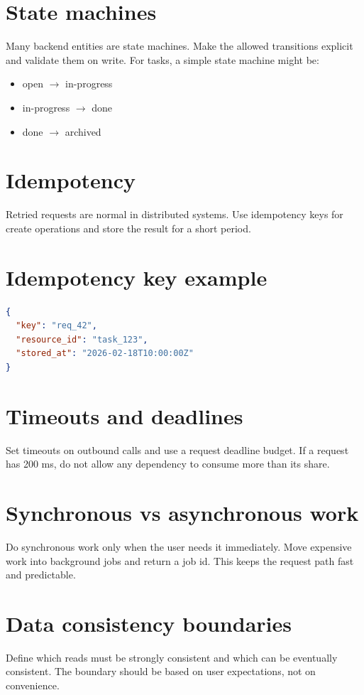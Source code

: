 \section{State machines}
Many backend entities are state machines.
Make the allowed transitions explicit and validate them on write.
For tasks, a simple state machine might be:
\begin{itemize}[nosep]
  \item open $\rightarrow$ in-progress
  \item in-progress $\rightarrow$ done
  \item done $\rightarrow$ archived
\end{itemize}

\section{Idempotency}
Retried requests are normal in distributed systems.
Use idempotency keys for create operations and store the result for a short period.

\section{Idempotency key example}
\begin{lstlisting}[language=JSON]
{
  "key": "req_42",
  "resource_id": "task_123",
  "stored_at": "2026-02-18T10:00:00Z"
}
\end{lstlisting}

\section{Timeouts and deadlines}
Set timeouts on outbound calls and use a request deadline budget.
If a request has 200 ms, do not allow any dependency to consume more than its share.

\section{Synchronous vs asynchronous work}
Do synchronous work only when the user needs it immediately.
Move expensive work into background jobs and return a job id.
This keeps the request path fast and predictable.

\section{Data consistency boundaries}
Define which reads must be strongly consistent and which can be eventually consistent.
The boundary should be based on user expectations, not on convenience.

